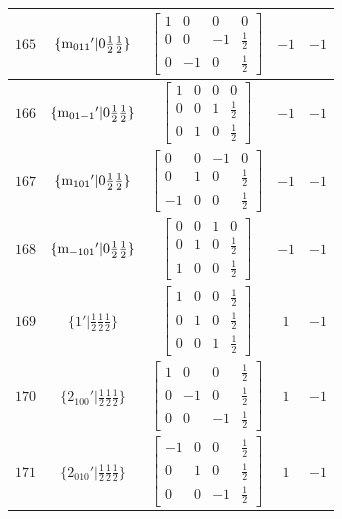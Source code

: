 \documentclass[fleqn,8pt]{jsarticle}
\begin{document}
\begin{longtable}{ccccc}
$ 165 $ & $ \{{\rm m}_{011}{}'|0 \frac{1}{2} \frac{1}{2}\} $ & $ \begin{bmatrix} 1 & 0 & 0 & 0 \\ 0 & 0 & -1 & \frac{1}{2} \\ 0 & -1 & 0 & \frac{1}{2} \end{bmatrix} $ & $ -1 $ & $ -1 $ \\ \hline
$ 166 $ & $ \{{\rm m}_{01-1}{}'|0 \frac{1}{2} \frac{1}{2}\} $ & $ \begin{bmatrix} 1 & 0 & 0 & 0 \\ 0 & 0 & 1 & \frac{1}{2} \\ 0 & 1 & 0 & \frac{1}{2} \end{bmatrix} $ & $ -1 $ & $ -1 $ \\ \hline
$ 167 $ & $ \{{\rm m}_{101}{}'|0 \frac{1}{2} \frac{1}{2}\} $ & $ \begin{bmatrix} 0 & 0 & -1 & 0 \\ 0 & 1 & 0 & \frac{1}{2} \\ -1 & 0 & 0 & \frac{1}{2} \end{bmatrix} $ & $ -1 $ & $ -1 $ \\ \hline
$ 168 $ & $ \{{\rm m}_{-101}{}'|0 \frac{1}{2} \frac{1}{2}\} $ & $ \begin{bmatrix} 0 & 0 & 1 & 0 \\ 0 & 1 & 0 & \frac{1}{2} \\ 1 & 0 & 0 & \frac{1}{2} \end{bmatrix} $ & $ -1 $ & $ -1 $ \\ \hline
$ 169 $ & $ \{1{}'|\frac{1}{2} \frac{1}{2} \frac{1}{2}\} $ & $ \begin{bmatrix} 1 & 0 & 0 & \frac{1}{2} \\ 0 & 1 & 0 & \frac{1}{2} \\ 0 & 0 & 1 & \frac{1}{2} \end{bmatrix} $ & $ 1 $ & $ -1 $ \\ \hline
$ 170 $ & $ \{2{}_{100}{}'|\frac{1}{2} \frac{1}{2} \frac{1}{2}\} $ & $ \begin{bmatrix} 1 & 0 & 0 & \frac{1}{2} \\ 0 & -1 & 0 & \frac{1}{2} \\ 0 & 0 & -1 & \frac{1}{2} \end{bmatrix} $ & $ 1 $ & $ -1 $ \\ \hline
$ 171 $ & $ \{2{}_{010}{}'|\frac{1}{2} \frac{1}{2} \frac{1}{2}\} $ & $ \begin{bmatrix} -1 & 0 & 0 & \frac{1}{2} \\ 0 & 1 & 0 & \frac{1}{2} \\ 0 & 0 & -1 & \frac{1}{2} \end{bmatrix} $ & $ 1 $ & $ -1 $ \\ \hline

\end{longtable}
\end{document}
